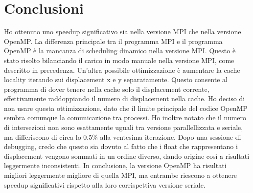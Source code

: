 \documentclass[a4paper,11pt, twoside]{report}
\begin{document}
\section*{Conclusioni}
Ho ottenuto uno speedup significativo sia nella versione MPI che nella versione OpenMP.
La differenza principale tra il programma MPI e il programma OpenMP è la mancanza di scheduling dinamico nella versione MPI.
Questo è stato risolto bilanciando il carico in modo manuale nella versione MPI, come descritto in precedenza.
Un'altra possibile ottimizzazione è aumentare la cache locality iterando sui displacement x e y separatamente.
Questo consente al programma di dover tenere nella cache solo il displacement corrente, effettivamente raddoppiando il numero di displacement nella cache.
Ho deciso di non usare questa ottimizzazione, dato che il limite principale del codice OpenMP sembra comunque la comunicazione tra processi.
Ho inoltre notato che il numero di intersezioni non sono esattamente uguali tra versione parallellizzata e seriale, ma differiscono di circa lo 0.5\% alla ventesima iterazione.
Dopo una sessione di debugging, credo che questo sia dovuto al fatto che i float che rappresentano i displacement vengono sommati in un ordine diverso, dando origine così a risultati leggermente inconsistenti.
In conclusione, la versione OpenMP ha risultati migliori leggermente migliore di quella MPI, ma entrambe riescono a ottenere speedup significativi rispetto alla loro corrispettiva versione seriale.
\end{document}
